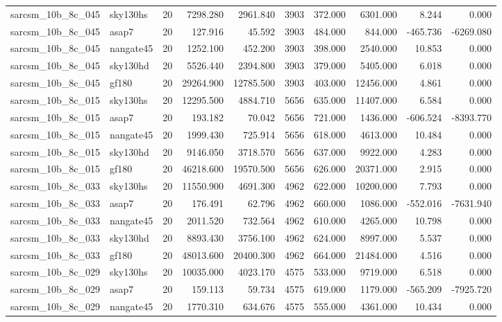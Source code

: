 \begin{longtable}{llrrrrrrrr}
sarcsm\_10b\_8c\_045 & sky130hs & 20 & 7298.280 & 2961.840 & 3903 & 372.000 & 6301.000 & 8.244 & 0.000 \\
sarcsm\_10b\_8c\_045 & asap7 & 20 & 127.916 & 45.592 & 3903 & 484.000 & 844.000 & -465.736 & -6269.080 \\
sarcsm\_10b\_8c\_045 & nangate45 & 20 & 1252.100 & 452.200 & 3903 & 398.000 & 2540.000 & 10.853 & 0.000 \\
sarcsm\_10b\_8c\_045 & sky130hd & 20 & 5526.440 & 2394.800 & 3903 & 379.000 & 5405.000 & 6.018 & 0.000 \\
sarcsm\_10b\_8c\_045 & gf180 & 20 & 29264.900 & 12785.500 & 3903 & 403.000 & 12456.000 & 4.861 & 0.000 \\
sarcsm\_10b\_8c\_015 & sky130hs & 20 & 12295.500 & 4884.710 & 5656 & 635.000 & 11407.000 & 6.584 & 0.000 \\
sarcsm\_10b\_8c\_015 & asap7 & 20 & 193.182 & 70.042 & 5656 & 721.000 & 1436.000 & -606.524 & -8393.770 \\
sarcsm\_10b\_8c\_015 & nangate45 & 20 & 1999.430 & 725.914 & 5656 & 618.000 & 4613.000 & 10.484 & 0.000 \\
sarcsm\_10b\_8c\_015 & sky130hd & 20 & 9146.050 & 3718.570 & 5656 & 637.000 & 9922.000 & 4.283 & 0.000 \\
sarcsm\_10b\_8c\_015 & gf180 & 20 & 46218.600 & 19570.500 & 5656 & 626.000 & 20371.000 & 2.915 & 0.000 \\
sarcsm\_10b\_8c\_033 & sky130hs & 20 & 11550.900 & 4691.300 & 4962 & 622.000 & 10200.000 & 7.793 & 0.000 \\
sarcsm\_10b\_8c\_033 & asap7 & 20 & 176.491 & 62.796 & 4962 & 660.000 & 1086.000 & -552.016 & -7631.940 \\
sarcsm\_10b\_8c\_033 & nangate45 & 20 & 2011.520 & 732.564 & 4962 & 610.000 & 4265.000 & 10.798 & 0.000 \\
sarcsm\_10b\_8c\_033 & sky130hd & 20 & 8893.430 & 3756.100 & 4962 & 624.000 & 8997.000 & 5.537 & 0.000 \\
sarcsm\_10b\_8c\_033 & gf180 & 20 & 48013.600 & 20400.300 & 4962 & 664.000 & 21484.000 & 4.516 & 0.000 \\
sarcsm\_10b\_8c\_029 & sky130hs & 20 & 10035.000 & 4023.170 & 4575 & 533.000 & 9719.000 & 6.518 & 0.000 \\
sarcsm\_10b\_8c\_029 & asap7 & 20 & 159.113 & 59.734 & 4575 & 619.000 & 1179.000 & -565.209 & -7925.720 \\
sarcsm\_10b\_8c\_029 & nangate45 & 20 & 1770.310 & 634.676 & 4575 & 555.000 & 4361.000 & 10.434 & 0.000 \\

\end{longtable}
